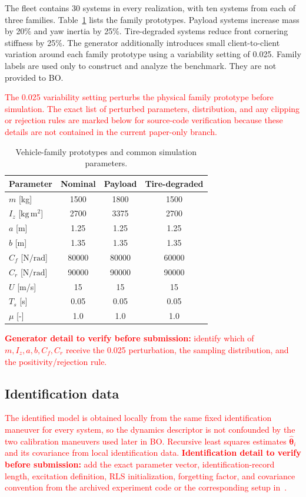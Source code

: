 \documentclass[conference]{IEEEtran}
\newcommand{\rev}[1]{\textcolor{red}{#1}}
\begin{document}
The fleet contains 30 systems in every realization, with ten systems from each of three families. Table~\ref{tab:vehicle_params} lists the family prototypes. Payload systems increase mass by 20\% and yaw inertia by 25\%. Tire-degraded systems reduce front cornering stiffness by 25\%. The generator additionally introduces small client-to-client variation around each family prototype using a variability setting of 0.025. Family labels are used only to construct and analyze the benchmark. They are not provided to BO.

\rev{The 0.025 variability setting perturbs the physical family prototype before simulation. The exact list of perturbed parameters, distribution, and any clipping or rejection rules are marked below for source-code verification because these details are not contained in the current paper-only branch.}
\begin{table}[t]
\centering
\caption{Vehicle-family prototypes and common simulation parameters.}
\label{tab:vehicle_params}
\scriptsize
\setlength{\tabcolsep}{3.5pt}
\begin{tabular}{@{}lccc@{}}
\toprule
Parameter & Nominal & Payload & Tire-degraded\\
\midrule
$m$ [kg] & 1500 & 1800 & 1500\\
$I_z$ [$\mathrm{kg\,m^2}$] & 2700 & 3375 & 2700\\
$a$ [m] & 1.25 & 1.25 & 1.25\\
$b$ [m] & 1.35 & 1.35 & 1.35\\
$C_f$ [$\mathrm{N/rad}$] & 80000 & 80000 & 60000\\
$C_r$ [$\mathrm{N/rad}$] & 90000 & 90000 & 90000\\
$U$ [m/s] & 15 & 15 & 15\\
$T_s$ [s] & 0.05 & 0.05 & 0.05\\
$\mu$ [-] & 1.0 & 1.0 & 1.0\\
\bottomrule
\end{tabular}
\end{table}
\rev{\textbf{Generator detail to verify before submission:} identify which of $m,I_z,a,b,C_f,C_r$ receive the 0.025 perturbation, the sampling distribution, and the positivity/rejection rule.}

\subsection{Identification data}
\rev{The identified model is obtained locally from the same fixed identification maneuver for every system, so the dynamics descriptor is not confounded by the two calibration maneuvers used later in BO. Recursive least squares estimates $\hat{\boldsymbol\theta}_i$ and its covariance from local identification data.}
\rev{\textbf{Identification detail to verify before submission:} add the exact parameter vector, identification-record length, excitation definition, RLS initialization, forgetting factor, and covariance convention from the archived experiment code or the corresponding setup in~\cite{weber2026ifac}.}
\end{document}
